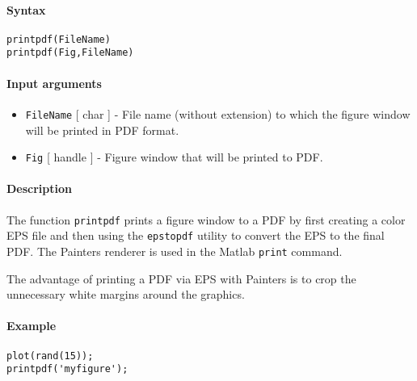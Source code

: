


	\paragraph{Syntax}

\begin{verbatim}
printpdf(FileName)
printpdf(Fig,FileName)
\end{verbatim}

\paragraph{Input arguments}

\begin{itemize}
\item
  \texttt{FileName} {[} char {]} - File name (without extension) to
  which the figure window will be printed in PDF format.
\item
  \texttt{Fig} {[} handle {]} - Figure window that will be printed to
  PDF.
\end{itemize}

\paragraph{Description}

The function \texttt{printpdf} prints a figure window to a PDF by first
creating a color EPS file and then using the \texttt{epstopdf} utility
to convert the EPS to the final PDF. The Painters renderer is used in
the Matlab \texttt{print} command.

The advantage of printing a PDF via EPS with Painters is to crop the
unnecessary white margins around the graphics.

\paragraph{Example}

\begin{verbatim}
plot(rand(15));
printpdf('myfigure');
\end{verbatim}


